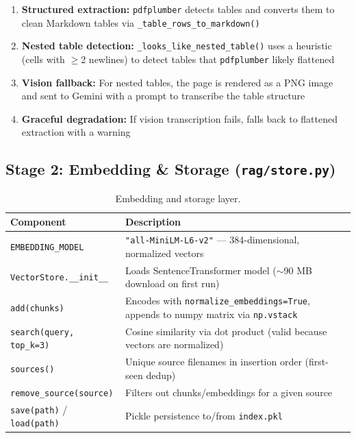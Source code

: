 \documentclass[11pt,a4paper]{paper}
\begin{document}
\begin{enumerate}
  \item \textbf{Structured extraction:} \texttt{pdfplumber} detects tables and converts them to clean Markdown tables via \texttt{\_table\_rows\_to\_markdown()}
  \item \textbf{Nested table detection:} \texttt{\_looks\_like\_nested\_table()} uses a heuristic (cells with $\geq$2 newlines) to detect tables that \texttt{pdfplumber} likely flattened
  \item \textbf{Vision fallback:} For nested tables, the page is rendered as a PNG image and sent to Gemini with a prompt to transcribe the table structure
  \item \textbf{Graceful degradation:} If vision transcription fails, falls back to flattened extraction with a warning
\end{enumerate}

\subsection{Stage 2: Embedding \& Storage (\texttt{rag/store.py})}

\begin{table}[h]
\centering
\small
\begin{tabular}{>{\raggedright}p{4.0cm} >{\raggedright\arraybackslash}p{10.5cm}}
\toprule
\textbf{Component} & \textbf{Description} \\
\midrule
\texttt{EMBEDDING\_MODEL} & \texttt{"all-MiniLM-L6-v2"} — 384-dimensional, normalized vectors \\
\texttt{VectorStore.\_\_init\_\_} & Loads SentenceTransformer model ($\sim$90 MB download on first run) \\
\texttt{add(chunks)} & Encodes with \texttt{normalize\_embeddings=True}, appends to numpy matrix via \texttt{np.vstack} \\
\texttt{search(query, top\_k=3)} & Cosine similarity via dot product (valid because vectors are normalized) \\
\texttt{sources()} & Unique source filenames in insertion order (first-seen dedup) \\
\texttt{remove\_source(source)} & Filters out chunks/embeddings for a given source \\
\texttt{save(path)} / \texttt{load(path)} & Pickle persistence to/from \texttt{index.pkl} \\
\bottomrule
\end{tabular}
\caption{Embedding and storage layer.}
\label{tab:store}
\end{table}
\end{document}
